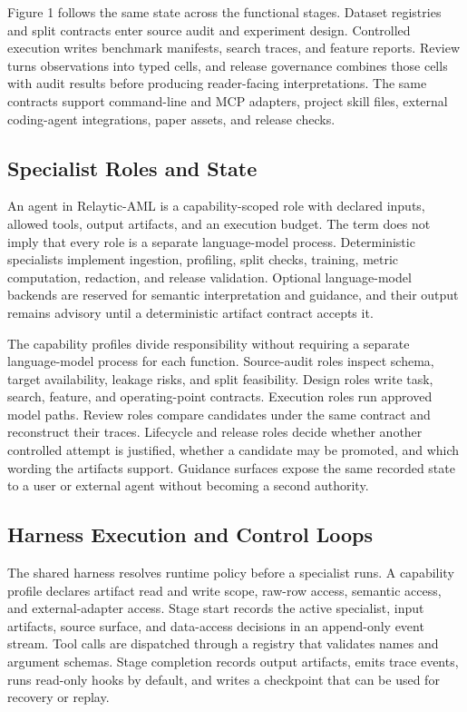 \documentclass[11pt]{article}
\begin{document}
Figure 1 follows the same state across the functional stages. Dataset registries and split contracts enter source audit and experiment design. Controlled execution writes benchmark manifests, search traces, and feature reports. Review turns observations into typed cells, and release governance combines those cells with audit results before producing reader-facing interpretations. The same contracts support command-line and MCP adapters, project skill files, external coding-agent integrations, paper assets, and release checks.

\subsection{Specialist Roles and State}

An agent in Relaytic-AML is a capability-scoped role with declared inputs, allowed tools, output artifacts, and an execution budget. The term does not imply that every role is a separate language-model process. Deterministic specialists implement ingestion, profiling, split checks, training, metric computation, redaction, and release validation. Optional language-model backends are reserved for semantic interpretation and guidance, and their output remains advisory until a deterministic artifact contract accepts it.

The capability profiles divide responsibility without requiring a separate language-model process for each function. Source-audit roles inspect schema, target availability, leakage risks, and split feasibility. Design roles write task, search, feature, and operating-point contracts. Execution roles run approved model paths. Review roles compare candidates under the same contract and reconstruct their traces. Lifecycle and release roles decide whether another controlled attempt is justified, whether a candidate may be promoted, and which wording the artifacts support. Guidance surfaces expose the same recorded state to a user or external agent without becoming a second authority.

\subsection{Harness Execution and Control Loops}

The shared harness resolves runtime policy before a specialist runs. A capability profile declares artifact read and write scope, raw-row access, semantic access, and external-adapter access. Stage start records the active specialist, input artifacts, source surface, and data-access decisions in an append-only event stream. Tool calls are dispatched through a registry that validates names and argument schemas. Stage completion records output artifacts, emits trace events, runs read-only hooks by default, and writes a checkpoint that can be used for recovery or replay.
\end{document}
